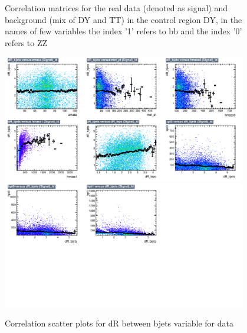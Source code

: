 \begin{figure}[!htb]
\caption{ Correlation matrices for the real data (denoted as signal) and background (mix of DY and TT) in the control region DY, in the names of few variables the index '1' refers to bb and the index '0' refers to ZZ}
\label{fig:corrMatrix_CRDY}                                                       
\end{figure}





\begin{figure}[!htb]%
\centering
\includegraphics[width=0.95\textwidth]{figures/CRDY/dataset/plots/correlationscatter_dR_bjets__Id_c1.pdf}
\includegraphics[width=0.95\textwidth]{figures/CRDY/dataset/plots/correlationscatter_dR_bjets__Id_c2.pdf}
\caption{ Correlation scatter plots for dR between bjets variable for data}%
\label{fig:correlations_CRDY_drbjets_S}                                                       
\end{figure}




